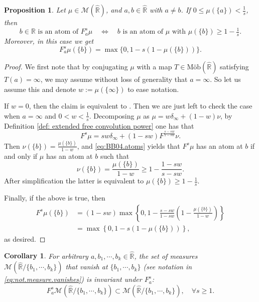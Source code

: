 \documentclass[reqno,11pt]{amsart}
\newtheorem{corollary}[theorem]{Corollary}
\newtheorem{proposition}[theorem]{Proposition}
\theoremstyle{remark}
\newcommand{\rr}{\mathbb{R}}
\newcommand{\MM}{\mathcal{M}}
\newcommand{\freepower}[1]{F^{#1}}
\newcommand{\pfreepower}[2]{F_{#1}^{#2}}
\newcommand{\mobr}{\text{Möb}(\hat{\rr})}
\begin{document}
\begin{proposition}\label{prop:sizeofatom}
    Let $\mu\in\MM({\hat{\rr}})$, and $a,b\in \hat{\rr}$ with $a\neq b$. If $ 0\leq \mu(\{a\})<\tfrac{1}{s} $, then \begin{equation}
\label{eq:atoms.pfreepower}
 b\in \rr\text{ is an atom of }\pfreepower{a}{s}\mu \quad \Leftrightarrow \quad b \text{ is an atom of $\mu$ with }\mu(\{b\})\geq 1-\tfrac{1}{s}.   
\end{equation}
Moreover, in this case we get
    $$ \pfreepower{a}{s}\mu(\{b\}) = \max\{0,1-s(1-\mu(\{b\}))\}. $$
\end{proposition}
\begin{proof}
We first note that by conjugating $\mu$ with a map $T\in \mobr$ satisfying $T(a)=\infty$, we may assume without loss of generality that $a=\infty$. So let us assume this and denote $w:=\mu(\{\infty\})$ to ease notation.

If $w=0$, then the claim is equivalent to \cite[Theorem 3.1]{belinschi2004atoms}. Then we are just left to check the case when $a=\infty$ and $ 0< w<\tfrac{1}{s} $. Decomposing $\mu$ as $\mu = w\delta_{\infty} + (1-w)\nu$, by  Definition \ref{def: extended free convolution power} one has that
$$ \freepower{s}\mu =  sw\delta_\infty + (1-sw)\freepower{\frac{s-sw}{1-sw}}\nu.$$
    Then $\nu(\{b \})=\frac{\mu(\{b\})}{1-w}$, and \eqref{eq:BB04.atoms} yields that $ \freepower{s}\mu $ has an atom at $b$ if and only if $\mu$ has an atom at $b$ such that
    $$ \nu(\{b\})=\frac{\mu(\{b\})}{1-w}\geq 1- \frac{1-sw}{s-sw}.$$
    After simplification the latter is equivalent to $ \mu(\{b\})\geq 1-\frac{1}{s} $. 
    
    Finally, if the above is true, then
    \begin{align*}
         \freepower{s}\mu(\{b\}) &= (1-sw)\max\left\{ 0,1- \frac{s-sw}{1-sw}\left(1-\frac{\mu(\{b\})}{1-w} \right) \right\}\\
         &= \max\left\{ 0,1-s(1-\mu(\{b\})) \right\},
    \end{align*}
    as desired.
\end{proof}

\begin{corollary}\label{cor:polarpowerpreservesatomlocation}
    For arbitrary $ a,b_1,\cdots,b_k\in \hat{\rr} $, the set of measures $\MM( \hat{\rr}/\{b_1,\cdots,b_k\} ) $ that vanish at $\{b_1,\cdots,b_k\}$ (see notation in \eqref{eq:not.measure.vanishes}) is invariant under $ \pfreepower{a}{s} $:
    $$ \pfreepower{a}{s}\MM( \hat{\rr}/\{b_1,\cdots,b_k\} )\subset \MM( \hat{\rr}/\{b_1,\cdots,b_k\} ),\quad \forall s\geq 1. $$
\end{corollary}
\end{document}
